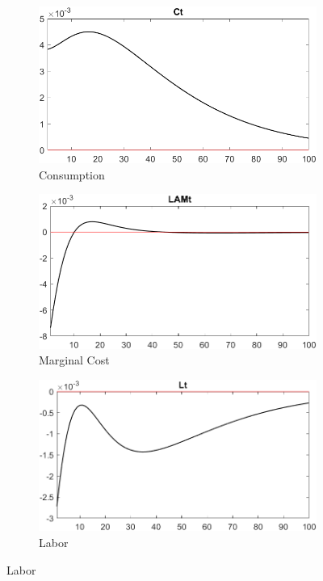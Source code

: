 \documentclass[
	12pt, 
	]{article}
\numberwithin{equation}{section}
\theoremstyle{definition}
\theoremstyle{plain}
\theoremstyle{plain}
\theoremstyle{plain}
\begin{document}
\begin{figure}[h!]
\vspace*{0.5cm}

\begin{subfigure}[b]{0.3\textwidth}
	\centering
	\includegraphics[width=\textwidth]{shock_ZAt/shock_ZAt_Ct}
	\caption{Consumption}
	\label{fig:zat-consumption}
\end{subfigure}
\hfill
\begin{subfigure}[b]{0.3\textwidth}
	\centering
	\includegraphics[width=\textwidth]{shock_ZAt/shock_ZAt_LAMBDAt}
	\caption{Marginal Cost}
	\label{fig:zat-marginal-cost}
\end{subfigure}
\hfill
\begin{subfigure}[b]{0.3\textwidth}
	\centering
	\includegraphics[width=\textwidth]{shock_ZAt/shock_ZAt_Lt}
	\caption{Labor}
	\label{fig:zat-labor}
\end{subfigure}
\hfill


\end{figure}
\end{document}
